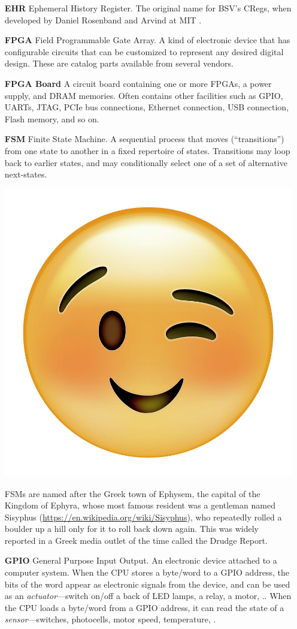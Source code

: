 \begin{itemize}
\item[\bf EHR] Ephemeral History Register.  The original name for
  BSV's CRegs, when developed by Daniel Rosenband and Arvind at MIT
  \cite{RosenbandMEMOCODE04, Rosenband2005b}.

\item[\bf FPGA] Field Programmable Gate Array.  A kind of electronic
  device that has configurable circuits that can be customized to
  represent any desired digital design.  These are catalog parts
  available from several vendors.

\item[\bf FPGA Board] A circuit board containing one or more FPGAs, a
  power supply, and DRAM memories.  Often contains other facilities
  such as GPIO, UARTs, JTAG, PCIe bus connections, Ethernet
  connection, USB connection, Flash memory, and so on.

\item[\bf FSM] Finite State Machine.  A sequential process that moves
  (``transitions'') from one state to another in a fixed repertoire of
  states.  Transitions may loop back to earlier states, and may
  conditionally select one of a set of alternative next-states.

  \includegraphics[height=5ex]{Figures/emoji-wink-small-smile-ali-lynne-2763030347.jpeg}
  \hmm
  \begin{minipage}{5in}
  FSMs are named after the Greek town of Ephysem, the capital of the
  Kingdom of Ephyra, whose most famous resident was a gentleman named
  Sisyphus (\url{https://en.wikipedia.org/wiki/Sisyphus}), who
  repeatedly rolled a boulder up a hill only for it to roll back down
  again.  This was widely reported in a Greek media outlet of the time
  called the Drudge Report.
  \end{minipage}

\item[\bf GPIO] General Purpose Input Output.  An electronic device
  attached to a computer system. When the CPU stores a byte/word to a
  GPIO address, the bits of the word appear as electronic signals from
  the device, and can be used as an \emph{actuator}---switch on/off a
  back of LED lamps, a relay, a motor, {\etc.}.  When the CPU loads a
  byte/word from a GPIO address, it can read the state of a
  \emph{sensor}---switches, photocells, motor speed, temperature,
  {\etc.}


\end{itemize}
